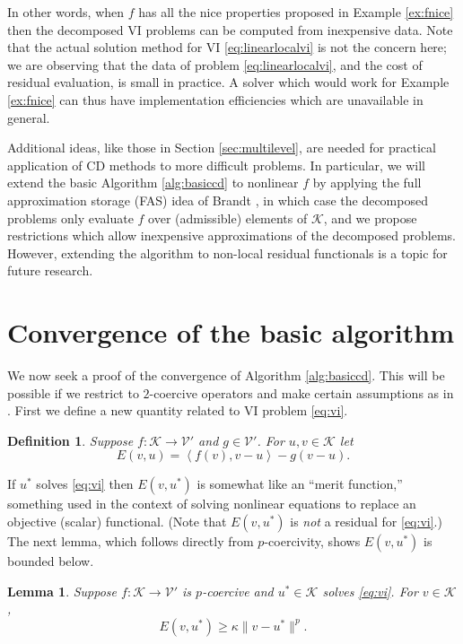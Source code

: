 \documentclass[letterpaper,final,12pt,reqno]{amsart}
\theoremstyle{cstyle}
\newtheorem{lemma}[theorem]{Lemma}
\theoremstyle{cstyle*}
\theoremstyle{dstyle}
\newtheorem{definition}[theorem]{Definition}
\numberwithin{equation}{section}
\numberwithin{figure}{section}
\numberwithin{table}{section}
\numberwithin{theorem}{section}
\newcommand{\cK}{\mathcal{K}}
\newcommand{\cV}{\mathcal{V}}
\newcommand{\ip}[2]{\left<#1,#2\right>}
\begin{document}
In other words, when $f$ has all the nice properties proposed in Example \ref{ex:fnice} then the decomposed VI problems can be computed from inexpensive data.  Note that the actual solution method for VI \eqref{eq:linearlocalvi} is not the concern here; we are observing that the data of problem \eqref{eq:linearlocalvi}, and the cost of residual evaluation, is small in practice.  A solver which would work for Example \ref{ex:fnice} can thus have implementation efficiencies which are unavailable in general.

Additional ideas, like those in Section \ref{sec:multilevel}, are needed for practical application of CD methods to more difficult problems.  In particular, we will extend the basic Algorithm \ref{alg:basiccd} to nonlinear $f$ by applying the full approximation storage (FAS) idea of Brandt \cite{Brandt1977}, in which case the decomposed problems only evaluate $f$ over (admissible) elements of $\mathcal{K}$, and we propose restrictions which allow inexpensive approximations of the decomposed problems.  However, extending the algorithm to non-local residual functionals is a topic for future research.


\section{Convergence of the basic algorithm} \label{sec:convergence}

We now seek a proof of the convergence of Algorithm \ref{alg:basiccd}.  This will be possible if we restrict to $2$-coercive operators and make certain assumptions as in \cite{Tai2003}.  First we define a new quantity related to VI problem \eqref{eq:vi}.

\begin{definition} Suppose $f:\cK \to \cV'$ and $g \in \cV'$.  For $u,v \in \cK$ let
\begin{equation}
  E(v,u) = \ip{f(v)}{v-u} - g(v-u).  \label{eq:normlikedefn}
\end{equation}
\end{definition}

If $u^*$ solves \eqref{eq:vi} then $E(v,u^*)$ is somewhat like an ``merit function,'' something used in the context of solving nonlinear equations \cite{NocedalWright2006} to replace an objective (scalar) functional.  (Note that $E(v,u^*)$ is \emph{not} a residual for \eqref{eq:vi}.)  The next lemma, which follows directly from $p$-coercivity, shows $E(v,u^*)$ is bounded below.

\begin{lemma} \label{lem:normlike}  Suppose $f:\mathcal{K} \to \mathcal{V}'$ is $p$-coercive and $u^* \in \mathcal{K}$ solves \eqref{eq:vi}.  For $v \in \mathcal{K}$,
\begin{equation}
  E(v,u^*) \ge \kappa \|v-u^*\|^p.  \label{eq:normlikebound}
\end{equation}
\end{lemma}
\end{document}
